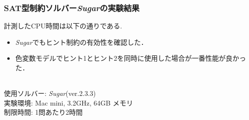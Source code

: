 \begin{frame}
\frametitle{SAT型制約ソルバー\textit{Sugar}の実験結果}
計測したCPU時間は以下の通りである.
\begin{block}{}
    {\tiny  }
\end{block}
\begin{itemize}
\item \textit{Sugar}でもヒント制約の有効性を確認した．
\item 色変数モデルでヒント1とヒント2を同時に使用した場合が一番性能が良かった．
\end{itemize}
\\
{\footnotesize
使用ソルバー: \textit{Sugar}(ver.2.3.3)\\
実験環境: Mac mini, 3.2GHz, 64GB メモリ\\
制限時間: 1問あたり2時間\\
}
\end{frame}

